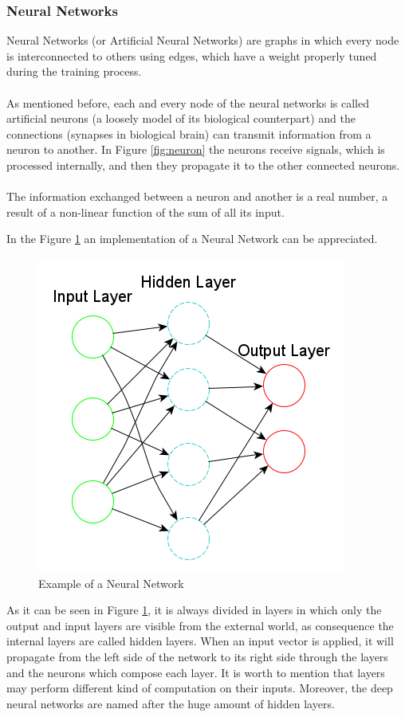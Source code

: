 \subsubsection{Neural Networks}

Neural Networks (or Artificial Neural Networks) are graphs in which every node is interconnected to others using edges, which have a weight properly tuned during the training process.\\\\
As mentioned before, each and every node of the neural networks is called artificial neurons (a loosely model of its biological counterpart) and the connections (synapses in biological brain) can transmit information from a neuron to another. In Figure \ref{fig:neuron} the neurons receive signals, which is processed internally, and then they propagate it to the other connected neurons.\\\\
The information exchanged between a neuron and another is a real number, a result of a non-linear function of the sum of all its input.

In the Figure \ref{fig:nn} an implementation of a Neural Network can be appreciated.
\begin{figure}[H]
\centering
\captionsetup{justification=centering}
\includegraphics[scale=0.55]{./figure/neural_network.png}
\caption{Example of a Neural Network}
\label{fig:nn}
\end{figure}
As it can be seen in Figure \ref{fig:nn}, it is always divided in layers in which only the output and input layers are visible from the external world, as consequence the internal layers are called hidden layers. When an input vector is applied, it will propagate from the left side of the network to its right side through the layers and the neurons which compose each layer. It is worth to mention that layers may perform different kind of computation on their inputs. Moreover, the deep neural networks are named after the huge amount of hidden layers.\\\\

